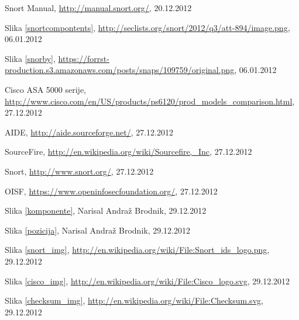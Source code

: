 \documentclass[12pt]{article}
\begin{document}
\clearpage
{}
\begin{thebibliography}{9}


Snort Manual, \url{http://manual.snort.org/}, 20.12.2012

Slika \ref{snortcompontents}, \url{http://seclists.org/snort/2012/q3/att-894/image.png}, 06.01.2012

Slika \ref{snorby}, \url{https://forrst-production.s3.amazonaws.com/posts/snaps/109759/original.png}, 06.01.2012

Cisco ASA 5000 serije, \url{http://www.cisco.com/en/US/products/ps6120/prod_models_comparison.html}, 27.12.2012

AIDE, \url{http://aide.sourceforge.net/}, 27.12.2012

SourceFire, \url{http://en.wikipedia.org/wiki/Sourcefire,_Inc}, 27.12.2012

Snort, \url{http://www.snort.org/}, 27.12.2012

OISF, \url{https://www.openinfosecfoundation.org/}, 27.12.2012

Slika \ref{komponente}, 
Narisal Andraž Brodnik, 29.12.2012

Slika \ref{pozicija}, 
Narisal Andraž Brodnik, 29.12.2012

Slika \ref{snort_img}, 
\url{http://en.wikipedia.org/wiki/File:Snort_ids_logo.png}, 29.12.2012

Slika \ref{cisco_img}, 
\url{http://en.wikipedia.org/wiki/File:Cisco_logo.svg}, 29.12.2012

 Slika \ref{checksum_img}, 
\url{http://en.wikipedia.org/wiki/File:Checksum.svg}, 29.12.2012

\end{thebibliography}
\end{document}
